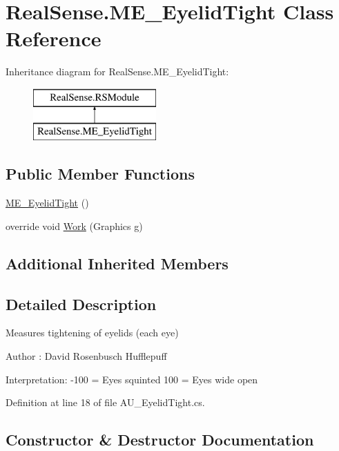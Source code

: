 \hypertarget{class_real_sense_1_1_m_e___eyelid_tight}{}\section{Real\+Sense.\+M\+E\+\_\+\+Eyelid\+Tight Class Reference}
\label{class_real_sense_1_1_m_e___eyelid_tight}
Inheritance diagram for Real\+Sense.\+M\+E\+\_\+\+Eyelid\+Tight\+:\begin{figure}[H]
\begin{center}
\leavevmode
\includegraphics[height=2.000000cm]{class_real_sense_1_1_m_e___eyelid_tight}
\end{center}
\end{figure}
\subsection*{Public Member Functions}
\begin{DoxyCompactItemize}
\item 
\hyperlink{class_real_sense_1_1_m_e___eyelid_tight_a8322c626219035e9ec76747f6faae8aa}{M\+E\+\_\+\+Eyelid\+Tight} ()
\item 
override void \hyperlink{class_real_sense_1_1_m_e___eyelid_tight_a95f0c9f0a9339b9fbcd7035847971216}{Work} (Graphics g)
\end{DoxyCompactItemize}
\subsection*{Additional Inherited Members}


\subsection{Detailed Description}
Measures tightening of eyelids (each eye) \begin{DoxyAuthor}{Author}
\+: David Rosenbusch  Hufflepuff
\end{DoxyAuthor}
Interpretation\+: -\/100 = Eyes squinted 100 = Eyes wide open 

Definition at line 18 of file A\+U\+\_\+\+Eyelid\+Tight.\+cs.



\subsection{Constructor \& Destructor Documentation}
\mbox{\label{class_real_sense_1_1_m_e___eyelid_tight_a8322c626219035e9ec76747f6faae8aa}} 
